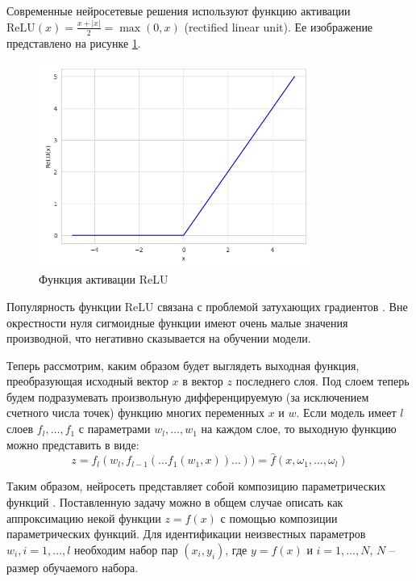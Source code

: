 Современные нейросетевые решения используют функцию активации \\
$\text{ReLU}(x) = \frac{x + |x|}{2} = \max(0, x)$ (rectified linear unit).
Ее изображение представлено на рисунке \ref{fig:relu}.

\begin{figure}[h]
    \centering
    \includegraphics[width=0.8\textwidth]{images/relu.png}
    \caption{Функция активации ReLU}
    \label{fig:relu}
\end{figure}

Популярность функции ReLU связана с проблемой затухающих градиентов \cite{dlbook}.
Вне окрестности нуля сигмоидные функции имеют очень малые значения производной, что негативно сказывается на обучении модели.

Теперь рассмотрим, каким образом будет выглядеть выходная функция, преобразующая исходный вектор $x$ в вектор $z$ последнего слоя.
Под слоем теперь будем подразумевать произвольную дифференцируемую (за исключением счетного числа точек) функцию многих переменных $x$ и $w$.
Если модель имеет $l$ слоев $f_l, \ldots, f_1$ с параметрами $w_l, \ldots, w_1$ на каждом слое, то выходную функцию можно представить в виде:
\begin{equation}
    z = f_l(w_l, f_{l-1}(\ldots f_1(w_1, x))\ldots)) = \hat{f}(x, \omega_1, \ldots, \omega_l)
\end{equation}

Таким образом, нейросеть представляет собой композицию параметрических функций \cite{VorontsovML}.
Поставленную задачу можно в общем случае описать как аппроксимацию некой функции $z = f(x)$ с помощью композиции параметрических функций.
Для идентификации неизвестных параметров $w_i, i = 1, \ldots, l$ необходим набор пар $(x_i, y_i)$, где $y = f(x)$ и $i = 1, \ldots, N$, $N$ -- размер обучаемого набора.


